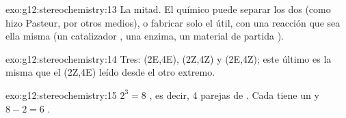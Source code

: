 \begin{solution}{exo:g12:stereochemistry:13}
La mitad. El químico puede separar los dos  (como hizo
Pasteur, por otros medios), o fabricar solo el  útil, con una
reacción que sea ella misma  (un catalizador , una enzima,
un material de partida ).
\end{solution}

\begin{solution}{exo:g12:stereochemistry:14}
Tres: (2E,4E), (2Z,4Z) y (2E,4Z); este último es la misma  que
el (2Z,4E) leído desde el otro extremo.
\end{solution}

\begin{solution}{exo:g12:stereochemistry:15}
$2^3 = 8$ , es decir, 4 parejas de . Cada
 tiene un  y $8 - 2 = 6$ .
\end{solution}

